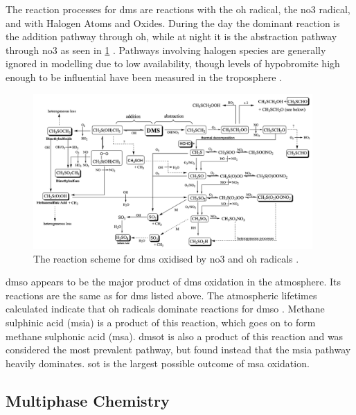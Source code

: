 	The reaction processes for \gls{dms} are reactions with the \gls{oh} radical, the \gls{no3} radical, and with Halogen Atoms and Oxides.  During the day the dominant reaction is the addition pathway through \gls{oh}, while at night it is the abstraction pathway through \gls{no3} as seen in \cref{fig:dmspath} \citep{barnes:2006ug}. Pathways involving halogen species are generally ignored in modelling due to low availability, though levels of hypobromite high enough to be influential have been measured in the troposphere \citep{platt2003role}.

	\begin{figure}[!htb]
	 	\centering
	    \includegraphics[width=0.95\textwidth,natwidth=1924,natheight=1068]{Fig/Literature_Review/dms_Pathway.png}
	    \caption{The reaction scheme for \gls{dms} oxidised by \gls{no3} and \gls{oh} radicals \citep{barnes:2006ug}.}
	    \label{fig:dmspath}
	\end{figure}

	\gls{dmso} appears to be the major product of \gls{dms} oxidation in the atmosphere. Its reactions are the same as for \gls{dms} listed above. The atmospheric lifetimes calculated indicate that \gls{oh} radicals dominate reactions for \gls{dmso} \citep{barnes:2006ug}. Methane sulphinic acid (\gls{msia}) is a product of this reaction, which goes on to form methane sulphonic acid (\gls{msa}). \gls{dmsot} is also a product of this reaction and was considered the most prevalent pathway, but \citet{barnes:2006ug} found instead that the \gls{msia} pathway heavily dominates. \gls{sot} is the largest possible outcome of \gls{msa} oxidation.

	\subsection{Multiphase Chemistry}
	\label{subsec:multchem}

